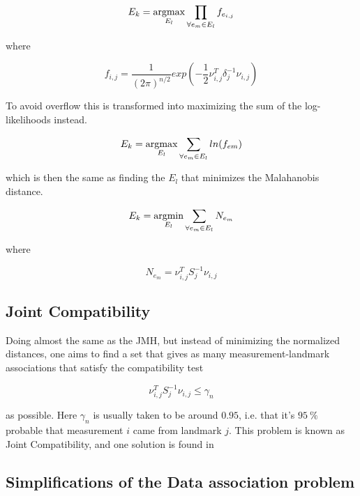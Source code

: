 \begin{equation}
    E_k = \operatorname*{argmax}_{E_l} \prod_{\forall e_m \in E_l} f_{e_{i,j}}
\end{equation}

where 

\begin{equation}
    f_{i,j} = \frac{1}{(2\pi)^{n/2}} exp(-\frac{1}{2}\nu_{i,j}^T\delta_j^{-1}\nu_{i,j})
\end{equation}

To avoid overflow this is transformed into maximizing the sum of the log-likelihoods instead.

\begin{equation}
    E_k = \operatorname*{argmax}_{E_l} \sum_{\forall e_m \in E_l} ln(f_{em})
\end{equation}

which is then the same as finding the $E_l$ that minimizes the Malahanobis distance.

\begin{equation}
    E_k = \operatorname*{argmin}_{E_l} \sum_{\forall e_m \in E_l} N_{e_m}
\end{equation}

where 

\begin{equation}
    N_{e_m} = \nu_{i,j}^TS_j^{-1}\nu_{i,j} 
\end{equation}

\subsection{Joint Compatibility}

Doing almost the same as the JMH, but instead of minimizing the normalized distances, one aims to find a set that gives as many measurement-landmark associations that satisfy the compatibility test

\begin{equation}
    \nu_{i,j}^TS_j^{-1}\nu_{i,j} \leq \gamma_n
\end{equation}

as possible. Here $\gamma_n$ is usually taken to be around $0.95$, i.e. that it's $\SI{95}{\percent}$ probable that measurement $i$ came from landmark $j$. This problem is known as Joint Compatibility, and one solution is found in \cite{Bailey}

\subsection{Simplifications of the Data association problem}

